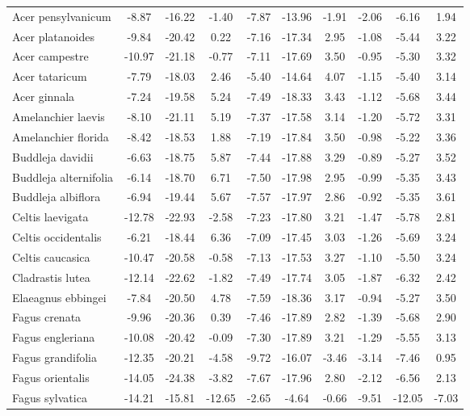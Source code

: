 \documentclass[11pt]{article}
\begin{document}
\begin{longtable}{p{1.50in}c{0.32in}c{0.32in}c{0.32in}c{0.32in}c{0.32in}c{0.32in}c{0.2in}c{0.3in}c{0.1in}}
  Acer pensylvanicum & -8.87 & -16.22 & -1.40 & -7.87 & -13.96 & -1.91 & -2.06 & -6.16 & 1.94 \\ 
  Acer platanoides & -9.84 & -20.42 & 0.22 & -7.16 & -17.34 & 2.95 & -1.08 & -5.44 & 3.22 \\ 
  Acer campestre & -10.97 & -21.18 & -0.77 & -7.11 & -17.69 & 3.50 & -0.95 & -5.30 & 3.32 \\ 
  Acer tataricum & -7.79 & -18.03 & 2.46 & -5.40 & -14.64 & 4.07 & -1.15 & -5.40 & 3.14 \\ 
  Acer ginnala & -7.24 & -19.58 & 5.24 & -7.49 & -18.33 & 3.43 & -1.12 & -5.68 & 3.44 \\ 
  Amelanchier laevis & -8.10 & -21.11 & 5.19 & -7.37 & -17.58 & 3.14 & -1.20 & -5.72 & 3.31 \\ 
  Amelanchier florida & -8.42 & -18.53 & 1.88 & -7.19 & -17.84 & 3.50 & -0.98 & -5.22 & 3.36 \\ 
  Buddleja davidii & -6.63 & -18.75 & 5.87 & -7.44 & -17.88 & 3.29 & -0.89 & -5.27 & 3.52 \\ 
  Buddleja alternifolia & -6.14 & -18.70 & 6.71 & -7.50 & -17.98 & 2.95 & -0.99 & -5.35 & 3.43 \\ 
  Buddleja albiflora & -6.94 & -19.44 & 5.67 & -7.57 & -17.97 & 2.86 & -0.92 & -5.35 & 3.61 \\ 
  Celtis laevigata & -12.78 & -22.93 & -2.58 & -7.23 & -17.80 & 3.21 & -1.47 & -5.78 & 2.81 \\ 
  Celtis occidentalis & -6.21 & -18.44 & 6.36 & -7.09 & -17.45 & 3.03 & -1.26 & -5.69 & 3.24 \\ 
  Celtis caucasica & -10.47 & -20.58 & -0.58 & -7.13 & -17.53 & 3.27 & -1.10 & -5.50 & 3.24 \\ 
  Cladrastis lutea & -12.14 & -22.62 & -1.82 & -7.49 & -17.74 & 3.05 & -1.87 & -6.32 & 2.42 \\ 
  Elaeagnus ebbingei & -7.84 & -20.50 & 4.78 & -7.59 & -18.36 & 3.17 & -0.94 & -5.27 & 3.50 \\ 
  Fagus crenata & -9.96 & -20.36 & 0.39 & -7.46 & -17.89 & 2.82 & -1.39 & -5.68 & 2.90 \\ 
  Fagus engleriana & -10.08 & -20.42 & -0.09 & -7.30 & -17.89 & 3.21 & -1.29 & -5.55 & 3.13 \\ 
  Fagus grandifolia & -12.35 & -20.21 & -4.58 & -9.72 & -16.07 & -3.46 & -3.14 & -7.46 & 0.95 \\ 
  Fagus orientalis & -14.05 & -24.38 & -3.82 & -7.67 & -17.96 & 2.80 & -2.12 & -6.56 & 2.13 \\ 
  Fagus sylvatica & -14.21 & -15.81 & -12.65 & -2.65 & -4.64 & -0.66 & -9.51 & -12.05 & -7.03 \\ 

\end{longtable}
\end{document}
